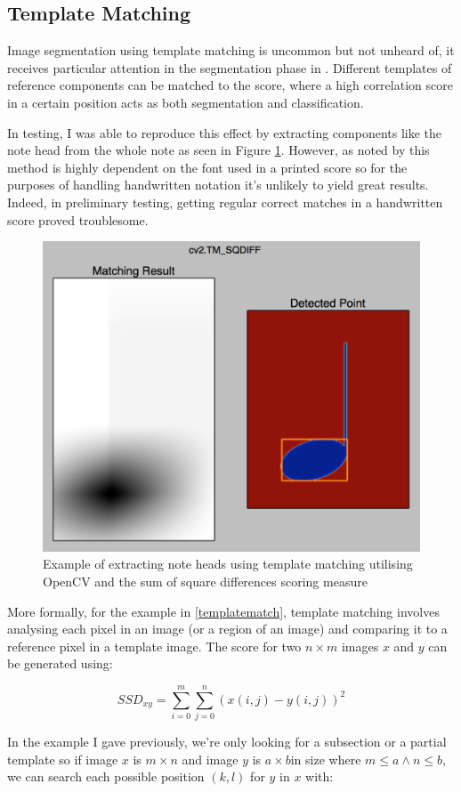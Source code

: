 \subsection{Template Matching}

Image segmentation using template matching is uncommon but not unheard of, it receives particular attention in the segmentation phase in \cite{rossant2002global}. Different templates of reference components can be matched to the score, where a high correlation score in a certain position acts as both segmentation and classification.

In testing, I was able to reproduce this effect by extracting components like the note head from the whole note as seen in Figure \cref{fig:templatematch}. However, as noted by \citeauthor{rossant2002global} this method is highly dependent on the font used in a printed score so for the purposes of handling handwritten notation it's unlikely to yield great results. Indeed, in preliminary testing, getting regular correct matches in a handwritten score proved troublesome.

\begin{figure}[h!]
  \includegraphics[width=0.6\linewidth]{gfx/template.png}
  \centering
  \caption{Example of extracting note heads using template matching utilising OpenCV and the sum of square differences scoring measure}
  \label{fig:templatematch}
\end{figure}

More formally, for the example in \cref{templatematch}, template matching involves analysing each pixel in an image (or a region of an image) and comparing it to a reference pixel in a template image. The score for two $n \times m$ images $x$ and $y$ can be generated using:

$$SSD_{xy} = \sum_{i = 0}^m \sum_{j = 0}^n (x(i, j) - y(i, j))^2$$

In the example I gave previously, we're only looking for a subsection or a partial template so if image $x$ is $m \times n$ and image $y$ is $a \times b$in size where $m \le a \land n \le b$, we can search each possible position $(k, l)$ for $y$ in $x$ with:

